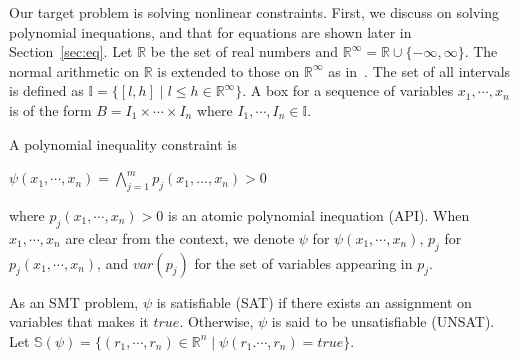 \documentclass[runningheads,a4paper,oribibl]{llncs}
\newcommand{\Real}{{\mathbb R}}
\begin{document}
\sloppy

Our target problem is solving nonlinear constraints.
First, we discuss on solving polynomial inequations, and
that for equations are shown later in Section~\ref{sec:eq}. 
Let $\mathbb{R}$ be the set of real numbers and
$\mathbb{R}^\infty = \mathbb{R} \cup \{-\infty, \infty \}$.
The normal arithmetic on $\mathbb{R}$ is extended to those on
$\mathbb{R}^\infty$ as in~\cite{moore}.
The set of all intervals is defined as
$\mathbb{I} = \{[l, h] \mid l \le h \in \mathbb{R}^\infty \}$.
A box for a sequence of variables $x_1, \cdots, x_n$ is of the form
$B = I_1 \times \cdots \times I_n$ where $I_1, \cdots, I_n \in \mathbb{I}$.

\begin{definition}
A polynomial inequality constraint is

{\qquad\qquad\qquad\qquad
$\psi(x_1,\cdots,x_n) = \bigwedge \limits_{j=1}^m p_j(x_1,...,x_n) > 0$}

\noindent
where $p_j(x_1,\cdots,x_n) > 0$ is an atomic polynomial inequation (API).
When $x_1, \cdots, x_n$ are clear from the context, we denote 
$\psi$ for $\psi(x_1, \cdots, x_n)$, $p_j$ for $p_j(x_1, \cdots, x_n)$,
and $var(p_j)$ for the set of variables appearing in $p_j$. 
\end{definition}
As an SMT problem, $\psi$ is satisfiable (SAT) if there exists an assignment
on variables
that makes it $true$.
Otherwise, $\psi$ is said to be unsatisfiable (UNSAT).
Let
${\mathbb{S}(\psi) = \{(r_1,\cdots, r_n) \in \Real^n \mid \psi(r_1. \cdots, r_n) = true\}}$. 

\end{document}
